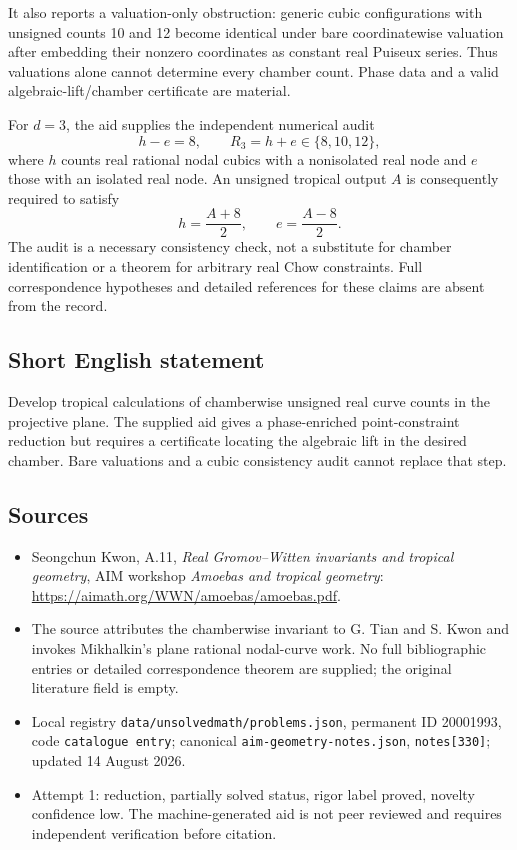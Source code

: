 \documentclass[11pt]{article}
\begin{document}
It also reports a valuation-only obstruction: generic cubic configurations with unsigned counts 10 and 12 become identical under bare coordinatewise valuation after embedding their nonzero coordinates as constant real Puiseux series. Thus valuations alone cannot determine every chamber count. Phase data and a valid algebraic-lift/chamber certificate are material.

For \(d=3\), the aid supplies the independent numerical audit
\[
h-e=8,\qquad R_3=h+e\in\{8,10,12\},
\]
where \(h\) counts real rational nodal cubics with a nonisolated real node and \(e\) those with an isolated real node. An unsigned tropical output \(A\) is consequently required to satisfy
\[
h=\frac{A+8}{2},\qquad e=\frac{A-8}{2}.
\]
The audit is a necessary consistency check, not a substitute for chamber identification or a theorem for arbitrary real Chow constraints. Full correspondence hypotheses and detailed references for these claims are absent from the record.
\subsection{Short English statement}
Develop tropical calculations of chamberwise unsigned real curve counts in the projective plane. The supplied aid gives a phase-enriched point-constraint reduction but requires a certificate locating the algebraic lift in the desired chamber. Bare valuations and a cubic consistency audit cannot replace that step.
\subsection{Sources}
\begin{itemize}
\item Seongchun Kwon, A.11, \emph{Real Gromov--Witten invariants and tropical geometry}, AIM workshop \emph{Amoebas and tropical geometry}: \url{https://aimath.org/WWN/amoebas/amoebas.pdf}.
\item The source attributes the chamberwise invariant to G. Tian and S. Kwon and invokes Mikhalkin's plane rational nodal-curve work. No full bibliographic entries or detailed correspondence theorem are supplied; the original literature field is empty.
\item Local registry \texttt{data/unsolvedmath/problems.json}, permanent ID 20001993, code \texttt{catalogue entry}; canonical \texttt{aim-geometry-notes.json}, \texttt{notes[330]}; updated 14 August 2026.
\item Attempt 1: reduction, partially solved status, rigor label proved, novelty confidence low. The machine-generated aid is not peer reviewed and requires independent verification before citation.
\end{itemize}
\end{document}
